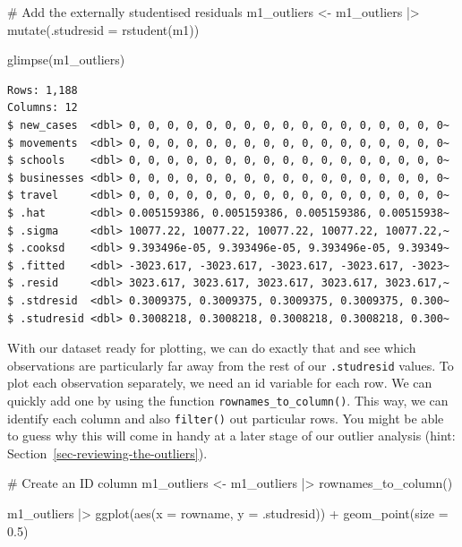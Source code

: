 \documentclass[
  letterpaper,
  DIV=11,
  numbers=noendperiod]{scrreprt}
\newenvironment{Shaded}{\begin{snugshade}}{\end{snugshade}}
\newcommand{\AttributeTok}[1]{\textcolor[rgb]{0.40,0.45,0.13}{#1}}
\newcommand{\CommentTok}[1]{\textcolor[rgb]{0.37,0.37,0.37}{#1}}
\newcommand{\FloatTok}[1]{\textcolor[rgb]{0.68,0.00,0.00}{#1}}
\newcommand{\FunctionTok}[1]{\textcolor[rgb]{0.28,0.35,0.67}{#1}}
\newcommand{\NormalTok}[1]{\textcolor[rgb]{0.00,0.23,0.31}{#1}}
\newcommand{\OtherTok}[1]{\textcolor[rgb]{0.00,0.23,0.31}{#1}}
\newcommand{\SpecialCharTok}[1]{\textcolor[rgb]{0.37,0.37,0.37}{#1}}
\begin{document}
\begin{Shaded}
\begin{Highlighting}[]
\CommentTok{\# Add the externally studentised residuals}
\NormalTok{m1\_outliers }\OtherTok{\textless{}{-}}
\NormalTok{  m1\_outliers }\SpecialCharTok{|\textgreater{}}
  \FunctionTok{mutate}\NormalTok{(}\AttributeTok{.studresid =} \FunctionTok{rstudent}\NormalTok{(m1))}

\FunctionTok{glimpse}\NormalTok{(m1\_outliers)}
\end{Highlighting}
\end{Shaded}

\begin{verbatim}
Rows: 1,188
Columns: 12
$ new_cases  <dbl> 0, 0, 0, 0, 0, 0, 0, 0, 0, 0, 0, 0, 0, 0, 0, 0, 0~
$ movements  <dbl> 0, 0, 0, 0, 0, 0, 0, 0, 0, 0, 0, 0, 0, 0, 0, 0, 0~
$ schools    <dbl> 0, 0, 0, 0, 0, 0, 0, 0, 0, 0, 0, 0, 0, 0, 0, 0, 0~
$ businesses <dbl> 0, 0, 0, 0, 0, 0, 0, 0, 0, 0, 0, 0, 0, 0, 0, 0, 0~
$ travel     <dbl> 0, 0, 0, 0, 0, 0, 0, 0, 0, 0, 0, 0, 0, 0, 0, 0, 0~
$ .hat       <dbl> 0.005159386, 0.005159386, 0.005159386, 0.00515938~
$ .sigma     <dbl> 10077.22, 10077.22, 10077.22, 10077.22, 10077.22,~
$ .cooksd    <dbl> 9.393496e-05, 9.393496e-05, 9.393496e-05, 9.39349~
$ .fitted    <dbl> -3023.617, -3023.617, -3023.617, -3023.617, -3023~
$ .resid     <dbl> 3023.617, 3023.617, 3023.617, 3023.617, 3023.617,~
$ .stdresid  <dbl> 0.3009375, 0.3009375, 0.3009375, 0.3009375, 0.300~
$ .studresid <dbl> 0.3008218, 0.3008218, 0.3008218, 0.3008218, 0.300~
\end{verbatim}

With our dataset ready for plotting, we can do exactly that and see
which observations are particularly far away from the rest of our
\texttt{.studresid} values. To plot each observation separately, we need
an id variable for each row. We can quickly add one by using the
function \texttt{rownames\_to\_column()}. This way, we can identify each
column and also \texttt{filter()} out particular rows. You might be able
to guess why this will come in handy at a later stage of our outlier
analysis (hint: Section~\ref{sec-reviewing-the-outliers}).

\begin{Shaded}
\begin{Highlighting}[]
\CommentTok{\# Create an ID column}
\NormalTok{m1\_outliers }\OtherTok{\textless{}{-}}\NormalTok{ m1\_outliers }\SpecialCharTok{|\textgreater{}} \FunctionTok{rownames\_to\_column}\NormalTok{()}

\NormalTok{m1\_outliers }\SpecialCharTok{|\textgreater{}}
  \FunctionTok{ggplot}\NormalTok{(}\FunctionTok{aes}\NormalTok{(}\AttributeTok{x =}\NormalTok{ rowname,}
             \AttributeTok{y =}\NormalTok{ .studresid)) }\SpecialCharTok{+}
  \FunctionTok{geom\_point}\NormalTok{(}\AttributeTok{size =} \FloatTok{0.5}\NormalTok{)}
\end{Highlighting}
\end{Shaded}
\end{document}
